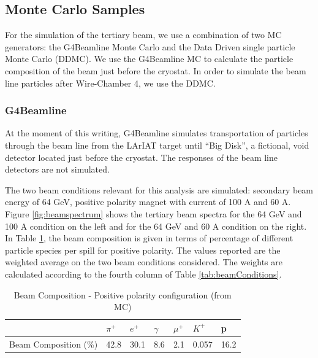 \subsection{Monte Carlo Samples}\label{sec:MCSamples}
For the simulation of the tertiary beam, we use a combination of two MC generators: the G4Beamline Monte Carlo and the Data Driven single particle Monte Carlo (DDMC).   We use the G4Beamline MC to calculate the particle composition of the beam just before the cryostat. In order to simulate the beam line particles after Wire-Chamber 4, we use the DDMC. 

\subsubsection{G4Beamline }\label{sec:G4Beamline}
At the moment of this writing,  G4Beamline simulates transportation of particles through the beam line from the LArIAT target until ``Big Disk'', a fictional, void detector located just before the cryostat. The responses of  the beam line detectors are not simulated. 

The two beam conditions relevant for this analysis are simulated: secondary beam energy of 64 GeV, positive polarity magnet with current of 100 A and 60 A. Figure \ref{fig:beamspectrum} shows the tertiary beam spectra for the 64 GeV and 100 A condition on the left and for the 64 GeV and 60 A condition on the right.
In Table \ref{tab:beamcomp2}, the beam composition is given in terms of percentage of different particle species per spill for positive polarity. The values reported are the weighted average on the two beam conditions considered. The weights are calculated according to the fourth column of Table \ref{tab:beamConditions}. 

\begin{table}[ht!]
\centering
\begin{tabular}{|l|l|l|l|l|l|l|}
\hline
                   & $\pi^+$ & $e^+$ & $\gamma$ & $\mu^+$ & $K^+$ & p \\ \hline
Beam Composition (\%) &    42.8     &  30.1     &    8.6      &    2.1     &    0.057    &    16.2            \\ \hline
\end{tabular}
\caption{Beam Composition - Positive polarity configuration (from MC)}
\label{tab:beamcomp2}
\end{table}



